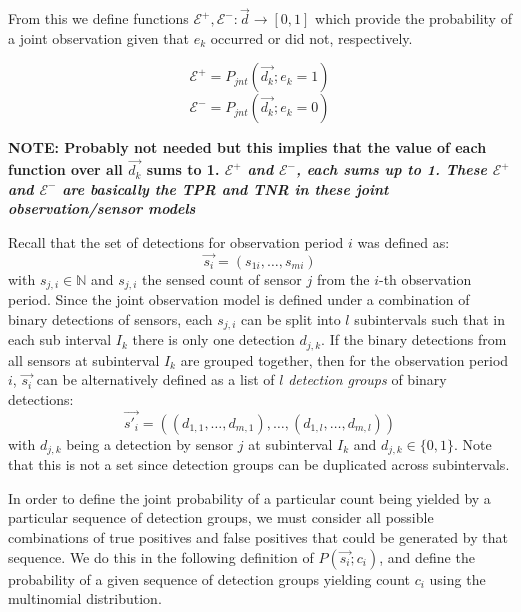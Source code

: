 From this we define functions $\mathcal E^+, \mathcal E^- : \vec{d} \rightarrow [0,1]$ which provide the probability of a joint observation given that $e_k$ occurred or did not, respectively. 

\begin{equation}
\mathcal E^+ = P_{jnt}(\vec{d_k} ; e_k=1)
\end{equation}
\begin{equation}
\mathcal E^- = P_{jnt}(\vec{d_k} ; e_k=0)
\end{equation}


\textbf{NOTE: Probably not needed but this implies that the value of each function over all $\vec{d_k}$ sums to 1. \emph{$\mathcal E^+$ and $\mathcal E^-$, each sums up to 1. These $\mathcal E^+$ and $\mathcal E^-$ are basically the TPR and TNR in these joint observation/sensor models}}

Recall that the set of detections for observation period $i$ was defined as:
\begin{equation*}
    \vec{s_i} = (s_{1i}, \ldots, s_{mi})
\end{equation*}
with $s_{j,i} \in \mathbb N$ and $s_{j,i}$ the sensed count of sensor $j$ from the $i$-th observation period. Since the joint observation model is defined under a combination of binary detections of sensors, each $s_{j,i}$ can be split into $l$ subintervals such that in each sub interval $I_k$ there is only one detection $d_{j,k}$. If the binary detections from all sensors at subinterval $I_k$ are grouped together, then for the observation period $i$, $\vec{s_i}$ can be alternatively defined as a list of $l$ \emph{detection groups} of binary detections:
\begin{equation}
    \label{eq:s_i_definition}
    \vec{s'_i} = ((d_{1,1}, \ldots, d_{m,1}), \ldots, (d_{1,l}, \ldots, d_{m,l}))
\end{equation}
\noindent with $d_{j,k}$ being a detection by sensor $j$ at subinterval $I_k$ and $d_{j,k} \in \{0, 1\}$. Note that this is not a set since detection groups can be duplicated across subintervals.

In order to define the joint probability of a particular count being yielded by a particular sequence of detection groups, we must consider all possible combinations of true positives and false positives that could be generated by that sequence. We do this in the following definition of $P(\vec{s_i} ; c_i)$, and define the probability of a given sequence of detection groups yielding count $c_i$ using the multinomial distribution.

